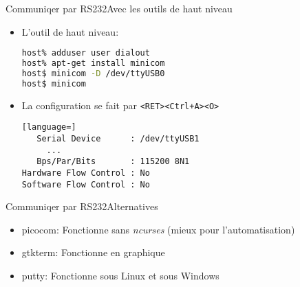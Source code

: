 \begin{frame}[fragile=singleslide]{Communiqer par RS232}{Avec les outils de haut niveau}
  \begin{itemize}
  \item L'outil de haut niveau: 
\begin{lstlisting}[language=sh]
host% adduser user dialout
host% apt-get install minicom
host$ minicom -D /dev/ttyUSB0
host$ minicom
\end{lstlisting} %
  \item La configuration se fait par \verb/<RET><Ctrl+A><O>/
\begin{lstlisting}[language=]
   Serial Device      : /dev/ttyUSB1
     ...
   Bps/Par/Bits       : 115200 8N1
Hardware Flow Control : No
Software Flow Control : No
\end{lstlisting}
  \end{itemize}
\end{frame}

\begin{frame}[fragile=singleslide]{Communiqer par RS232}{Alternatives}
  \begin{itemize}
  \item   picocom:   Fonctionne   sans  \emph{ncurses}   (mieux   pour
    l'automatisation)
  \item gtkterm: Fonctionne en graphique
  \item putty: Fonctionne sous Linux et sous Windows
  \end{itemize}
\end{frame}


